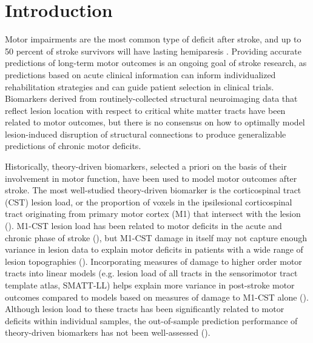 \documentclass[10pt]{article}
\begin{document}
\section{Introduction}
Motor impairments are the most common type of deficit after stroke, and up to 50 percent of stroke survivors will have lasting hemiparesis \cite{Kelly-Hayes2003-sp}. Providing accurate predictions of long-term motor outcomes is an ongoing goal of stroke research, as predictions based on acute clinical information can inform individualized rehabilitation strategies and can guide patient selection in clinical trials\cite{Bonkhoff2022-op, Boyd2017-gs}. Biomarkers derived from routinely-collected structural neuroimaging data that reflect lesion location with respect to critical white matter tracts have been related to motor outcomes\cite{Tozlu2020-qa, Kuceyeski2016-vj, Griffis2019-cy, Salvalaggio2020-pe, Bowren2022-rs}, but there is no consensus on how to optimally model lesion-induced disruption of structural connections to produce generalizable predictions of chronic motor deficits. 

Historically, theory-driven biomarkers, selected a priori on the basis of their involvement in motor function, have been used to model motor outcomes after stroke. The most well-studied theory-driven biomarker is the corticospinal tract (CST) lesion load, or the proportion of voxels in the ipsilesional corticospinal tract originating from primary motor cortex (M1) that intersect with the lesion (\cite{Zhu2010-qh, Feng2015-du, Findlater2019-je, Lam2018-xh, Pineiro2000-dv}). M1-CST lesion load  has been related to motor deficits in the acute and chronic phase of stroke (\cite{Boyd2017-gs, Kim2017-xe}), but M1-CST damage in itself may not capture enough variance in lesion data to explain motor deficits in patients with a wide range of lesion topographies (\cite{Park2016-te,Findlater2019-je, Paul2023-ce}). Incorporating measures of damage to higher order motor tracts into linear models (e.g. lesion load of all tracts in the sensorimotor tract template atlas, SMATT-LL) helps explain more variance in post-stroke motor outcomes compared to models based on measures of damage to M1-CST alone (\cite{Ito2022-em,  Rondina2016-ds, Rondina2017-ij, Schulz2012-yy, Park2016-te}). Although lesion load to these tracts has been significantly related to motor deficits within individual samples, the out-of-sample prediction performance of theory-driven biomarkers has not been well-assessed (\cite{Kim2017-xe}).
\end{document}
